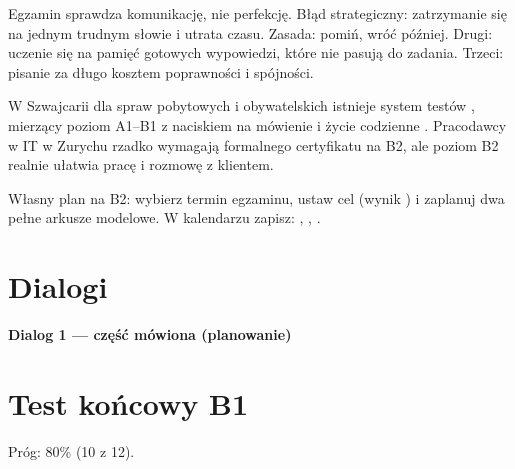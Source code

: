 \begin{falle}
Egzamin sprawdza komunikację, nie perfekcję. Błąd strategiczny: zatrzymanie się na jednym trudnym słowie i utrata czasu.
Zasada: pomiń, wróć później. Drugi: uczenie się na pamięć gotowych wypowiedzi, które nie pasują do zadania. Trzeci: pisanie za długo kosztem
poprawności i spójności.
\end{falle}

\begin{szwajcaria}
W Szwajcarii dla spraw pobytowych i obywatelskich istnieje system testów , mierzący poziom A1--B1 z naciskiem na mówienie i
życie codzienne .
Pracodawcy w IT w Zurychu rzadko wymagają formalnego certyfikatu na B2, ale poziom B2 realnie ułatwia pracę i rozmowę z klientem.
\end{szwajcaria}

\begin{praca}
Własny plan na B2: wybierz termin egzaminu, ustaw cel (wynik ) i zaplanuj dwa pełne arkusze modelowe. W kalendarzu
zapisz: , , .
\end{praca}

\section{Dialogi}
\textbf{Dialog 1 --- część mówiona (planowanie)}
\begin{dialog}
\end{dialog}

\section{Test końcowy B1}
Próg: 80\% (10 z 12).

